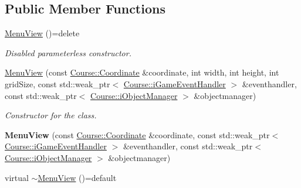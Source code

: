 \subsection*{Public Member Functions}
\begin{DoxyCompactItemize}
\item 
\hypertarget{class_student_1_1_menu_view_a09ed85f25242afdde2c47656d443c83a}{\hyperlink{class_student_1_1_menu_view_a09ed85f25242afdde2c47656d443c83a}{Menu\-View} ()=delete}\label{class_student_1_1_menu_view_a09ed85f25242afdde2c47656d443c83a}

\begin{DoxyCompactList}\small\item\em Disabled parameterless constructor. \end{DoxyCompactList}\item 
\hypertarget{class_student_1_1_menu_view_ac80d01ebb3102405f863a4b14ff148cc}{\hyperlink{class_student_1_1_menu_view_ac80d01ebb3102405f863a4b14ff148cc}{Menu\-View} (const \hyperlink{class_course_1_1_coordinate}{Course\-::\-Coordinate} \&coordinate, int width, int height, int grid\-Size, const std\-::weak\-\_\-ptr$<$ \hyperlink{class_course_1_1i_game_event_handler}{Course\-::i\-Game\-Event\-Handler} $>$ \&eventhandler, const std\-::weak\-\_\-ptr$<$ \hyperlink{class_course_1_1i_object_manager}{Course\-::i\-Object\-Manager} $>$ \&objectmanager)}\label{class_student_1_1_menu_view_ac80d01ebb3102405f863a4b14ff148cc}

\begin{DoxyCompactList}\small\item\em Constructor for the class. \end{DoxyCompactList}\item 
\hypertarget{class_student_1_1_menu_view_a1c366991e5c919d760320312aecb7c40}{{\bfseries Menu\-View} (const \hyperlink{class_course_1_1_coordinate}{Course\-::\-Coordinate} \&coordinate, const std\-::weak\-\_\-ptr$<$ \hyperlink{class_course_1_1i_game_event_handler}{Course\-::i\-Game\-Event\-Handler} $>$ \&eventhandler, const std\-::weak\-\_\-ptr$<$ \hyperlink{class_course_1_1i_object_manager}{Course\-::i\-Object\-Manager} $>$ \&objectmanager)}\label{class_student_1_1_menu_view_a1c366991e5c919d760320312aecb7c40}

\item 
\hypertarget{class_student_1_1_menu_view_ad4ad5ad0f2b8004180c05baffddbe085}{virtual \hyperlink{class_student_1_1_menu_view_ad4ad5ad0f2b8004180c05baffddbe085}{$\sim$\-Menu\-View} ()=default}\label{class_student_1_1_menu_view_ad4ad5ad0f2b8004180c05baffddbe085}


\end{DoxyCompactItemize}

